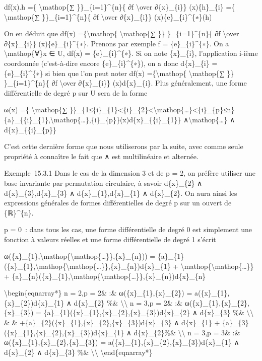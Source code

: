 \documentclass[]{article}
\begin{document}
df(x).h =\{ \textbackslash{}mathop\{∑ \}\}\_\{i=1\}\^{}\{n\}\{ ∂f
\textbackslash{}over ∂\{x\}\_\{i\}\} (x)\{h\}\_\{i\} =\{
\textbackslash{}mathop\{∑ \}\}\_\{i=1\}\^{}\{n\}\{ ∂f
\textbackslash{}over ∂\{x\}\_\{i\}\} (x)\{e\}\_\{i\}\^{}\{∗\}(h)

On en déduit que df(x) =\{\textbackslash{}mathop\{
\textbackslash{}mathop\{∑ \}\} \}\_\{i=1\}\^{}\{n\}\{ ∂f
\textbackslash{}over ∂\{x\}\_\{i\}\} (x)\{e\}\_\{i\}\^{}\{∗\}. Prenons
par exemple f = \{e\}\_\{i\}\^{}\{∗\}. On a \textbackslash{}mathop\{∀\}x
∈ U, df(x) = \{e\}\_\{i\}\^{}\{∗\}. Si on note \{x\}\_\{i\},
l'application i-ième coordonnée (c'est-à-dire encore
\{e\}\_\{i\}\^{}\{∗\}), on a donc d\{x\}\_\{i\} = \{e\}\_\{i\}\^{}\{∗\}
si bien que l'on peut noter df(x) =\{\textbackslash{}mathop\{
\textbackslash{}mathop\{∑ \}\} \}\_\{i=1\}\^{}\{n\}\{ ∂f
\textbackslash{}over ∂\{x\}\_\{i\}\} (x)d\{x\}\_\{i\}. Plus
généralement, une forme différentielle de degré p sur U sera de la forme

ω(x) =\{ \textbackslash{}mathop\{∑
\}\}\_\{1≤\{i\}\_\{1\}\textless{}\{i\}\_\{2\}\textless{}\textbackslash{}mathop\{\ldots{}\}\textless{}\{i\}\_\{p\}≤n\}\{a\}\_\{\{i\}\_\{1\},\textbackslash{}mathop\{\ldots{}\},\{i\}\_\{p\}\}(x)d\{x\}\_\{\{i\}\_\{1\}\}
∧\textbackslash{}mathop\{\ldots{}\} ∧ d\{x\}\_\{\{i\}\_\{p\}\}

C'est cette dernière forme que nous utiliserons par la suite, avec comme
seule propriété à connaître le fait que ∧ est multilinéaire et alternée.

Exemple~15.3.1 Dans le cas de la dimension 3 et de p = 2, on préfère
utiliser une base invariante par permutation circulaire, à savoir
d\{x\}\_\{2\} ∧ d\{x\}\_\{3\},d\{x\}\_\{3\} ∧
d\{x\}\_\{1\},d\{x\}\_\{1\} ∧ d\{x\}\_\{2\}. On aura ainsi les
expressions générales de formes différentielles de degré p sur un ouvert
de \{ℝ\}\^{}\{n\}.

p = 0~: dans tous les cas, une forme différentielle de degré 0 est
simplement une fonction à valeurs réelles et une forme différentielle de
degré 1 s'écrit

ω(\{x\}\_\{1\},\textbackslash{}mathop\{\textbackslash{}mathop\{\ldots{}\}\},\{x\}\_\{n\}))
=
\{a\}\_\{1\}(\{x\}\_\{1\},\textbackslash{}mathop\{\textbackslash{}mathop\{\ldots{}\}\},\{x\}\_\{n\})d\{x\}\_\{1\}
+ \textbackslash{}mathop\{\textbackslash{}mathop\{\ldots{}\}\} +
\{a\}\_\{n\}(\{x\}\_\{1\},\textbackslash{}mathop\{\textbackslash{}mathop\{\ldots{}\}\},\{x\}\_\{n\})d\{x\}\_\{n\}

\textbackslash{}begin\{eqnarray*\} n = 2,p = 2\& :\&
ω(\{x\}\_\{1\},\{x\}\_\{2\}) = a(\{x\}\_\{1\},\{x\}\_\{2\})d\{x\}\_\{1\}
∧ d\{x\}\_\{2\} \%\& \textbackslash{}\textbackslash{} n = 3,p = 2\& :\&
ω(\{x\}\_\{1\},\{x\}\_\{2\},\{x\}\_\{3\}) =
\{a\}\_\{1\}(\{x\}\_\{1\},\{x\}\_\{2\},\{x\}\_\{3\})d\{x\}\_\{2\} ∧
d\{x\}\_\{3\} \%\& \textbackslash{}\textbackslash{} \& \&
+\{a\}\_\{2\}(\{x\}\_\{1\},\{x\}\_\{2\},\{x\}\_\{3\})d\{x\}\_\{3\} ∧
d\{x\}\_\{1\} +
\{a\}\_\{3\}(\{x\}\_\{1\},\{x\}\_\{2\},\{x\}\_\{3\})d\{x\}\_\{1\} ∧
d\{x\}\_\{2\}\%\& \textbackslash{}\textbackslash{} n = 3,p = 3\& :\&
ω(\{x\}\_\{1\},\{x\}\_\{2\},\{x\}\_\{3\}) =
a(\{x\}\_\{1\},\{x\}\_\{2\},\{x\}\_\{3\})d\{x\}\_\{1\} ∧ d\{x\}\_\{2\} ∧
d\{x\}\_\{3\} \%\& \textbackslash{}\textbackslash{}
\textbackslash{}end\{eqnarray*\}
\end{document}
